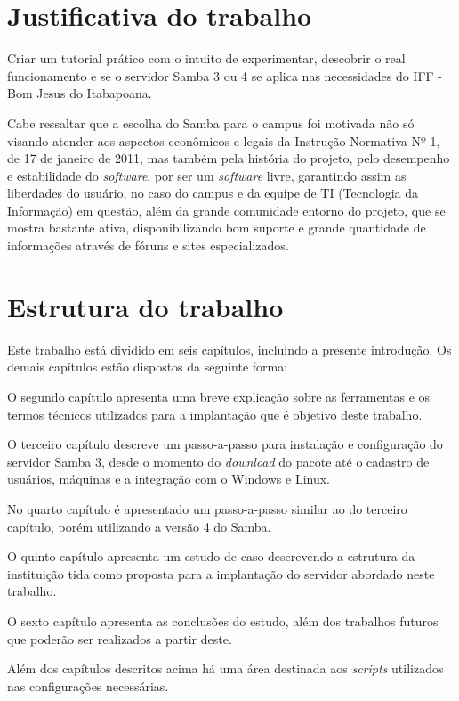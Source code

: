 \section{Justificativa do trabalho}

Criar um tutorial prático com o intuito de experimentar, descobrir o real funcionamento e se o servidor Samba 3 ou 4 se aplica nas necessidades do IFF - Bom Jesus do Itabapoana.

Cabe ressaltar que a escolha do Samba para o campus foi motivada não só visando atender aos aspectos econômicos e legais da Instrução Normativa Nº 1, de 17 de janeiro de 2011, mas também pela história do projeto, pelo desempenho e estabilidade do \textit{software}, por ser um \textit{software} livre, garantindo assim as liberdades do usuário, no caso do campus e da equipe de TI (Tecnologia da Informação) em questão, além da grande comunidade entorno do projeto, que se mostra bastante ativa, disponibilizando bom suporte e grande quantidade de informações através de fóruns e sites especializados.

\section{Estrutura do trabalho}

Este trabalho está dividido em seis capítulos, incluindo a presente introdução. Os demais capítulos estão dispostos da seguinte forma:

O segundo capítulo apresenta uma breve explicação sobre as ferramentas e os termos técnicos utilizados para a implantação que é objetivo deste trabalho. 

O terceiro capítulo descreve um passo-a-passo para instalação e configuração do servidor Samba 3, desde o momento do \textit{download} do pacote até o cadastro de usuários, máquinas e a integração com o Windows e Linux.

No quarto capítulo é apresentado um passo-a-passo similar ao do terceiro capítulo, porém utilizando a versão 4 do Samba.

O quinto capítulo apresenta um estudo de caso descrevendo a estrutura da instituição tida como proposta para a implantação do servidor abordado neste trabalho.

O sexto capítulo apresenta as conclusões do estudo, além dos trabalhos futuros que poderão ser realizados a partir deste.

Além dos capítulos descritos acima há uma área destinada aos \textit{scripts} utilizados nas configurações necessárias.